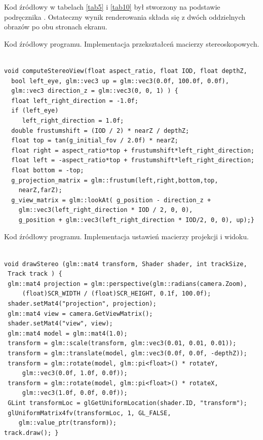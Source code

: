 Kod źródłowy w tabelach \ref{tab5} i \ref{tab10} był stworzony na podstawie podręcznika \cite{openglCookbook}. Ostateczny wynik renderowania składa się z dwóch oddzielnych obrazów po obu stronach ekranu.

\newpage
\begin{table}[H]
\caption{Kod źródłowy programu. Implementacja przekształceń macierzy stereoskopowych.}
\label{tab5}
\begin{lstlisting}[frame=single]  % Start your code-block

void computeStereoView(float aspect_ratio, float IOD, float depthZ, 
  bool left_eye, glm::vec3 up = glm::vec3(0.0f, 100.0f, 0.0f), 
  glm::vec3 direction_z = glm::vec3(0, 0, 1) ) {
  float left_right_direction = -1.0f;
  if (left_eye)
     left_right_direction = 1.0f;
  double frustumshift = (IOD / 2) * nearZ / depthZ;
  float top = tan(g_initial_fov / 2.0f) * nearZ;
  float right = aspect_ratio*top + frustumshift*left_right_direction;
  float left = -aspect_ratio*top + frustumshift*left_right_direction;
  float bottom = -top;
  g_projection_matrix = glm::frustum(left,right,bottom,top,
  	nearZ,farZ);
  g_view_matrix = glm::lookAt( g_position - direction_z + 
  	glm::vec3(left_right_direction * IOD / 2, 0, 0),
    g_position + glm::vec3(left_right_direction * IOD/2, 0, 0), up);}
\end{lstlisting}
\end{table}
\begin{table}[H]
\caption{Kod źródłowy programu. Implementacja ustawień macierzy projekcji i widoku.}
\label{tab10}
\begin{lstlisting}[frame=single]  % Start your code-block

void drawStereo (glm::mat4 transform, Shader shader, int trackSize,
 Track track ) {
 glm::mat4 projection = glm::perspective(glm::radians(camera.Zoom),
     (float)SCR_WIDTH / (float)SCR_HEIGHT, 0.1f, 100.0f);
 shader.setMat4("projection", projection);
 glm::mat4 view = camera.GetViewMatrix();
 shader.setMat4("view", view);
 glm::mat4 model = glm::mat4(1.0);
 transform = glm::scale(transform, glm::vec3(0.01, 0.01, 0.01));
 transform = glm::translate(model, glm::vec3(0.0f, 0.0f, -depthZ));
 transform = glm::rotate(model, glm::pi<float>() * rotateY, 
     glm::vec3(0.0f, 1.0f, 0.0f));
 transform = glm::rotate(model, glm::pi<float>() * rotateX, 
     glm::vec3(1.0f, 0.0f, 0.0f));
 GLint transformLoc = glGetUniformLocation(shader.ID, "transform");
 glUniformMatrix4fv(transformLoc, 1, GL_FALSE, 
 	glm::value_ptr(transform));
track.draw(); }
\end{lstlisting}
\end{table}


